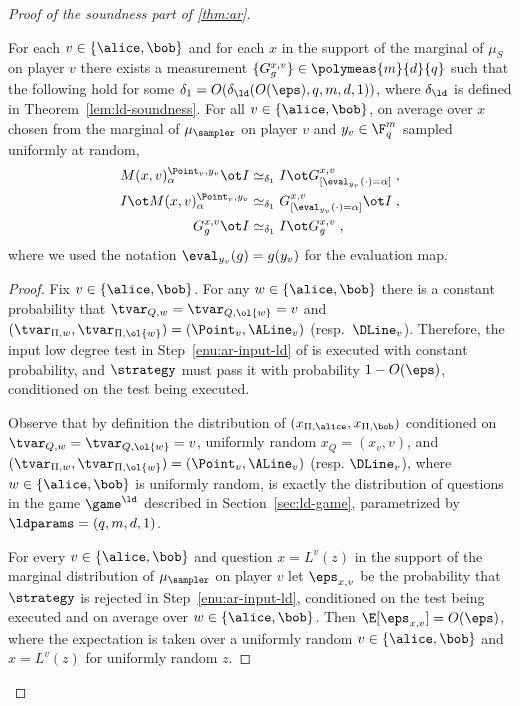 \begin{proof}[Proof of the soundness part of \cref{thm:ar}]
	\begin{claim}\label{claim:ar-3}
    For each $v \in \{\alice,\bob\}$ and for each $x$ in the support of the
    marginal of $\mu_S$ on player $v$ there exists a measurement
    $\{G^{{x},v}_{g}\} \in \polymeas{m}{d}{q}$ such that the following hold for
    some $\delta_1 = O(\delta_{\ld}(O({\eps}), q, m, d, 1))$, where
    $\delta_{\ld}$ is defined in Theorem~\ref{lem:ld-soundness}.
    For all $v\in\{\alice,\bob\}$, on average over ${x}$ chosen from the
    marginal of $\mu_{\sampler}$ on player $v$ and $y_v\in \F_q^m$ sampled
    uniformly at random,
    \begin{align}
      M({x}, v)^{\Point_v,y_v}_{\alpha}\ot I
      & \simeq_{\delta_1} I \ot G^{{x}, v}_{[\eval_{y_v}(\cdot) =
        \alpha]}\;, \label{eq:ld-single-input} \\
      I\ot  M({x}, v)^{\Point_v,y_v}_{\alpha}
      & \simeq_{\delta_1}  G^{{x}, v}_{[\eval_{y_v}(\cdot) =
        \alpha]} \ot I\;, \label{eq:ld-single-input-b} \\
      G^{{x}, v}_{g} \ot I
      & \simeq_{\delta_1} I \ot G^{{x},
        v}_{g}\;,\label{eq:ld-self-input}
    \end{align}
    where we used the notation $\eval_{y_v}(g)=g(y_v)$ for the evaluation map.
	\end{claim}
	
	\begin{proof}
    Fix $v\in\{\alice,\bob\}$.
    For any $w\in\{\alice,\bob\}$ there is a constant probability that
    $\tvar_{Q,w} = \tvar_{Q,\ol{w}} = v$ and $(\tvar_{\Pi,w}, \tvar_{\Pi,
      \ol{w}}) = (\Point_{v}, \ALine_{v})$ (resp.\ $\DLine_v$).
    Therefore, the input low degree test in Step~\ref{enu:ar-input-ld} of
     is executed with constant probability, and
    $\strategy$ must pass it with probability $1-O(\eps)$, conditioned on the
    test being executed.
			
    Observe that by definition the distribution of $(x_{\Pi,\alice},
    x_{\Pi,\bob})$ conditioned on $\tvar_{Q,w} = \tvar_{Q,\ol{w}} = v$,
    uniformly random $x_Q = (x_v,v)$, and $(\tvar_{\Pi,w}, \tvar_{\Pi, \ol{w}})
    = (\Point_{v}, \ALine_{v})$ (resp.
    $\DLine_v$), where $w\in\{\alice,\bob\}$ is uniformly random, is exactly the
    distribution of questions in the game $\game^\ld$ described in
    Section~\ref{sec:ld-game}, parametrized by $\ldparams = (q, m, d, 1)$.
			
    For every $v\in\{\alice,\bob\}$ and question $x=L^v(z)$ in the support of
    the marginal distribution of $\mu_\sampler$ on player $v$ let $\eps_{x,v}$
    be the probability that $\strategy$ is rejected in Step~\ref{enu:ar-input-ld},
    conditioned on the test being executed and on average over
    $w\in\{\alice,\bob\}$.
    Then $\E[\eps_{x,v}] = O(\eps)$, where the expectation is taken over a
    uniformly random $v\in\{\alice,\bob\}$ and $x=L^v(z)$ for uniformly random
    $z$.


\end{proof}
\end{proof}
